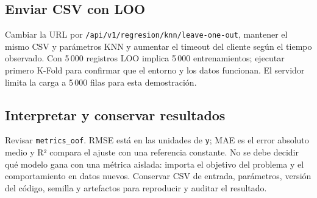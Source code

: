 \documentclass[11pt,a4paper]{article}
\begin{document}
\subsection{Enviar CSV con LOO}
Cambiar la URL por \texttt{/api/v1/regresion/knn/leave-one-out}, mantener el mismo CSV y parámetros KNN y aumentar el timeout del cliente según el tiempo observado. Con 5\,000 registros LOO implica 5\,000 entrenamientos; ejecutar primero K-Fold para confirmar que el entorno y los datos funcionan. El servidor limita la carga a 5\,000 filas para esta demostración.

\subsection{Interpretar y conservar resultados}
Revisar \texttt{metrics\_oof}. RMSE está en las unidades de \texttt{y}; MAE es el error absoluto medio y R² compara el ajuste con una referencia constante. No se debe decidir qué modelo gana con una métrica aislada: importa el objetivo del problema y el comportamiento en datos nuevos. Conservar CSV de entrada, parámetros, versión del código, semilla y artefactos para reproducir y auditar el resultado.
\end{document}
